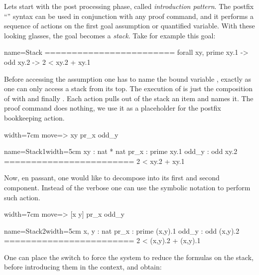 
Lets start with the post processing phase, called \emph{introduction pattern}.
The postfix ``'' syntax can be used in conjunction with any proof
command, and it performs a sequence of actions on the first goal assumption or
quantified variable.  With these looking glasses, the goal becomes a
\emph{stack}. Take for example this goal:

\begin{coqout}{name=Stack}{}
========================
forall xy, prime xy.1 -> odd xy.2 -> 2 < xy.2 + xy.1
\end{coqout}

Before accessing the assumption  one has to name the
bound variable , exactly as one can only access a stack from its top.
The execution of  is just the composition of
 with  and finally .  Each action
pulls out of the stack an item and names it.  The  proof
command does nothing,  we use it as a placeholder
for the postfix \C{=>} bookkeeping action.

\begin{coq}{}{width=7cm}
move=> xy pr_x odd_y
\end{coq}
\begin{coqout}{name=Stack1}{width=5cm}
 xy : nat * nat
 pr_x : prime xy.1
 odd_y : odd xy.2
========================
 2 < xy.2 + xy.1
\end{coqout}

Now, en passant, one would like to decompose  into its first
and second component.  Instead of the verbose 
one can use the symbolic notation \C{[]} to perform such action.

\begin{coq}{}{width=7cm}
move=> [x y] pr_x odd_y
\end{coq}
\begin{coqout}{name=Stack2}{width=5cm}
 x, y : nat
 pr_x : prime (x,y).1
 odd_y : odd (x,y).2
========================
 2 < (x,y).2 + (x,y).1
\end{coqout}

One can place the \C{/=} switch to force the system to reduce the formulas on
the stack, before introducing them in the context, and obtain:

